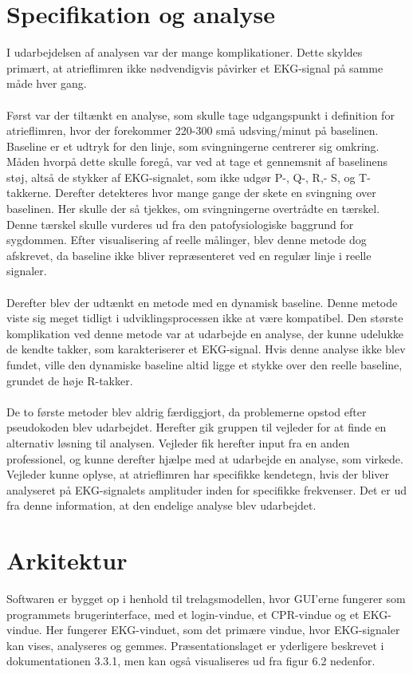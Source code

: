 \section{Specifikation og analyse}

I udarbejdelsen af analysen var der mange komplikationer. Dette skyldes primært, at atrieflimren ikke nødvendigvis påvirker et EKG-signal på samme måde hver gang.\\ \\
Først var der tiltænkt en analyse, som skulle tage udgangspunkt i definition for atrieflimren, hvor der forekommer 220-300 små udsving/minut på baselinen. Baseline er et udtryk for den linje, som svingningerne centrerer sig omkring. Måden hvorpå dette skulle foregå, var ved at tage et gennemsnit af baselinens støj, altså de stykker af EKG-signalet, som ikke udgør P-, Q-, R,- S, og T-takkerne. Derefter detekteres hvor mange gange der skete en svingning over baselinen. Her skulle der så tjekkes, om svingningerne overtrådte en tærskel. Denne tærskel skulle vurderes ud fra den patofysiologiske baggrund for sygdommen. Efter visualisering af reelle målinger, blev denne metode dog afskrevet, da baseline ikke bliver repræsenteret ved en regulær linje i reelle signaler. \\ \\ 
Derefter blev der udtænkt en metode med en dynamisk baseline. Denne metode viste sig meget tidligt i udviklingsprocessen ikke at være kompatibel. Den største komplikation ved denne metode var at udarbejde en analyse, der kunne udelukke de kendte takker, som karakteriserer et EKG-signal. Hvis denne analyse ikke blev fundet, ville den dynamiske baseline altid ligge et stykke over den reelle baseline, grundet de høje R-takker. \\ \\
De to første metoder blev aldrig færdiggjort, da problemerne opstod efter pseudokoden blev udarbejdet. Herefter gik gruppen til vejleder for at finde en alternativ løsning til analysen. Vejleder fik herefter input fra en anden professionel, og kunne derefter hjælpe med at udarbejde en analyse, som virkede.\\
Vejleder kunne oplyse, at atrieflimren har specifikke kendetegn, hvis der bliver analyseret på EKG-signalets amplituder inden for specifikke frekvenser. Det er ud fra denne information, at den endelige analyse blev udarbejdet. 

\section{Arkitektur}
Softwaren er bygget op i henhold til trelagsmodellen, hvor GUI’erne fungerer som programmets brugerinterface, med et login-vindue, et CPR-vindue og et EKG-vindue. Her fungerer EKG-vinduet, som det primære vindue, hvor EKG-signaler kan vises, analyseres og gemmes. Præsentationslaget er yderligere beskrevet i dokumentationen 3.3.1, men kan også visualiseres ud fra figur 6.2 nedenfor.

